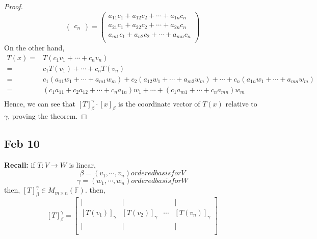 \documentclass[12pt]{article}
\newcommand{\mF}{{\mathbb{F}}}
\begin{document}
\begin{proof}
\[\begin{pmatrix}
				c_n
			\end{pmatrix}
			=
			\begin{pmatrix}
				a_{11}c_1 + a_{12}c_2 + \cdots + a_{1n}c_n\\
				a_{21}c_1 + a_{22}c_2 + \cdots + a_{2n}c_n\\
				a_{m1}c_1 + a_{n2}c_2 + \cdots + a_{mn}c_n\\
			\end{pmatrix}
		\]
		On the other hand, 
		\begin{align*}
			T(x) 
			=& T(c_1v_1 + \cdots + c_nv_n)\\
			=& c_1T(v_1) + \cdots + c_nT(v_n)\\
			=& c_1(a_{11}w_1+\cdots + a_{m1}w_m) + c_2(a_{12}w_1+\cdots
			+a_{m2}w_m) + \cdots + c_n(a_{1n}w_1+ \cdots + a_{mn}w_m)\\
			=& (c_1a_{11} + c_2a_{12} + \cdots + c_na_{1n})
			w_1 + \cdots + (c_1a_{m1}+\cdots +c_na_{mn})w_m\\
		\end{align*}
		Hence, we can see that $[T]_{\beta}^{\gamma} \cdot [x]_{\beta}$ is the
		coordinate vector of $T(x)$ relative to $\gamma$, proving the theorem.
	\end{proof}
	

	

	\newpage
	\subsection{Feb 10}

	\textbf{Recall: }if $T:V\to W$ is linear, 
	\[
		\beta = (v_1,\cdots, v_n) ordered basis for V
	\]
	\[
		\gamma = (w_1,\cdots, w_n) ordered basis for W
	\]
	then, $[T]_{\beta}^{\gamma} \in M_{m\times n} (\mF)$. then, 
	\[
			[T]^{\gamma}_{\beta} = 
			\begin{bmatrix}
				| & | &  & | \\
				[T(v_1)]_{\gamma} & [T(v_2)]_{\gamma} & \cdots 
								  & [T(v_n)]_{\gamma}\\
				| & | & & | \\
			\end{bmatrix}
	\]\\
\end{document}
